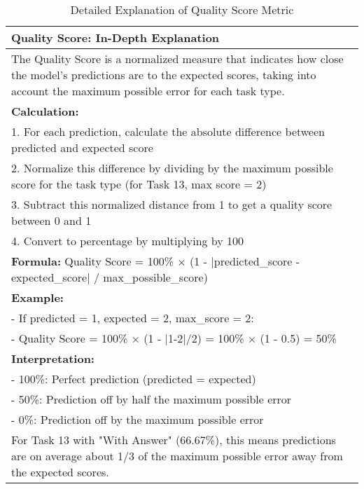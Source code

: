 \begin{table}[htbp]
\centering
\caption{Detailed Explanation of Quality Score Metric}
\begin{tabular}{p{12cm}}
\toprule
\textbf{Quality Score: In-Depth Explanation} \\
\midrule
The Quality Score is a normalized measure that indicates how close the model's predictions are to the expected scores, taking into account the maximum possible error for each task type. \\
\addlinespace
\textbf{Calculation:} \\
1. For each prediction, calculate the absolute difference between predicted and expected score \\
2. Normalize this difference by dividing by the maximum possible score for the task type (for Task 13, max score = 2) \\
3. Subtract this normalized distance from 1 to get a quality score between 0 and 1 \\
4. Convert to percentage by multiplying by 100 \\
\addlinespace
\textbf{Formula:} Quality Score = 100\% $\times$ (1 - $|$predicted\_score - expected\_score$|$ / max\_possible\_score) \\
\addlinespace
\textbf{Example:} \\
- If predicted = 1, expected = 2, max\_score = 2: \\
- Quality Score = 100\% $\times$ (1 - $|$1-2$|$/2) = 100\% $\times$ (1 - 0.5) = 50\% \\
\addlinespace
\textbf{Interpretation:} \\
- 100\%: Perfect prediction (predicted = expected) \\
- 50\%: Prediction off by half the maximum possible error \\
- 0\%: Prediction off by the maximum possible error \\
\addlinespace
For Task 13 with "With Answer" (66.67\%), this means predictions are on average about 1/3 of the maximum possible error away from the expected scores. \\
\bottomrule
\end{tabular}
\end{table}